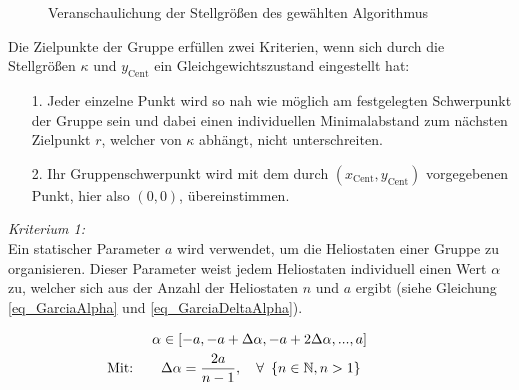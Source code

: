 \enlargethispage{\baselineskip}
\begin{figure}[h!]
    \centering
    \setlength{\fboxsep}{1pt}
    \setlength{\fboxrule}{1pt}
\caption[Veranschaulichung der Stellgrößen des gewählten Algorithmus]{Veranschaulichung der Stellgrößen des gewählten Algorithmus \cite[S.7]{Garcia2}}
    \label{fig_DispersionVeranschaulichung}
\end{figure}

Die Zielpunkte der Gruppe erfüllen zwei Kriterien, wenn sich durch die Stellgrößen $\kappa$ und $y_{\mathrm{Cent}}$ ein Gleichgewichtszustand eingestellt hat:
\begin{itemize}
\item[1.] Jeder einzelne Punkt wird so nah wie möglich am festgelegten Schwerpunkt der Gruppe sein und dabei einen individuellen Minimalabstand zum nächsten Zielpunkt $r$, welcher von $\kappa$ abhängt, nicht unterschreiten.
\item[2.] Ihr Gruppenschwerpunkt wird mit dem durch $(x_{\mathrm{Cent}}, y_{\mathrm{Cent}})$ vorgegebenen Punkt, hier also $(0,0)$, übereinstimmen.
\end{itemize}

\textit{Kriterium 1:}\\
Ein statischer Parameter $a$ wird verwendet, um die Heliostaten einer Gruppe zu organisieren.
Dieser Parameter weist jedem Heliostaten individuell einen Wert $\alpha$ zu, welcher sich aus der Anzahl der Heliostaten $n$ und $a$ ergibt (siehe Gleichung \ref{eq_GarciaAlpha} und \ref{eq_GarciaDeltaAlpha}).

\begin{gather}
    \alpha \in \left[-a, -a+\Delta\alpha, -a+2\Delta\alpha,..., a\right] \label{eq_GarciaAlpha}\\
    \text{\myequations{\quad Berechnung des individuellen Heliostatenparameters $\alpha$}}
\text{Mit:\qquad}\Delta\alpha = \frac{2a}{n-1}, \quad \forall~\left\{n \in \mathbb{N}, n > 1 \right\} \qquad\qquad \label{eq_GarciaDeltaAlpha}
\end{gather}

